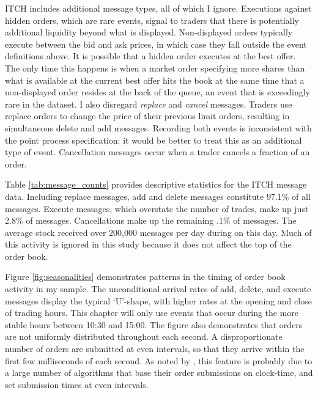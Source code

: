 ITCH includes additional message types, all of which I ignore. Executions against hidden orders, which are rare events, signal to traders that there is potentially additional liquidity beyond what is displayed. Non-displayed orders typically execute between the bid and ask prices, in which case they fall outside the event definitions above. It is possible that a hidden order executes at the best offer. The only time this happens is when a market order specifying more shares than what is available at the current best offer hits the book at the same time that a non-displayed order resides at the back of the queue, an event that is exceedingly rare in the dataset. I also disregard \textit{replace} and \textit{cancel} messages.
Traders use replace orders to change the price of their previous limit orders, resulting in simultaneous delete and add messages. Recording both events is inconsistent with the point process specification: it would be better to treat this as an additional type of event. Cancellation messages occur when a trader cancels a fraction of an order.

Table \ref{tab:message_counts} provides descriptive statistics for the ITCH message data. Including replace messages, add and delete messages constitute 97.1\% of all messages. Execute messages, which overstate the number of trades, make up just 2.8\% of messages. Cancellations make up the remaining .1\% of messages. The average stock received over 200,000 messages per day during on this day. Much of this activity is ignored in this study because it does not affect the top of the order book.

Figure \ref{fig:seasonalities} demonstrates patterns in the timing of order book activity in my sample. The unconditional arrival rates of add, delete, and execute messages display the typical `U'-shape, with higher rates at the opening and close of trading hours. This chapter will only use events that occur during the more stable hours between 10:30 and 15:00. The figure also demonstrates that orders are not uniformly distributed throughout each second. A disproportionate number of orders are submitted at even intervals, so that they arrive within the first few milliseconds of each second. As noted by \cite{}, this feature is probably due to a large number of algorithms that base their order submissions on clock-time, and set submission times at even intervals.

